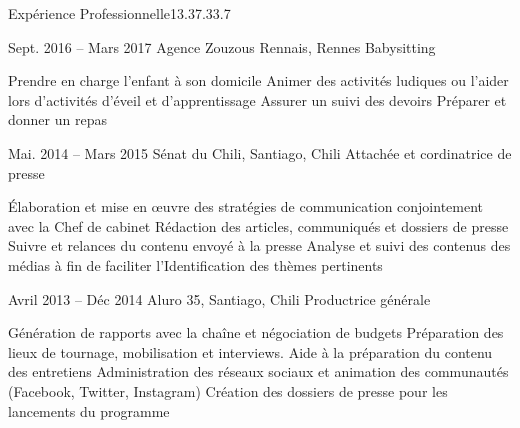 \documentclass[30pt, french]{tccv}
\begin{document}
\begin{upshape}
\begin{flat_frame}{Expérience Professionnelle}{13.3}{7.3}{3.7}{}
\begin{eventlist}
\setlength{\parskip}{0pt}    
\item{Sept. 2016 -- Mars 2017 }     
  {Agence Zouzous Rennais, Rennes}     
  {Babysitting}
     \fontsize{9pt}{1em}\color{text}\bodyfontlight\upshape\selectfont

\begin{itemize}
      \cvitem[\checkmark]  Prendre en charge l’enfant à son domicile                                    
      \cvitem[\checkmark]  Animer des activités ludiques ou l’aider lors d’activités d’éveil et d’apprentissage                                            
      \cvitem[\checkmark]  Assurer un suivi des devoirs
      \cvitem[\checkmark]  Préparer et donner un repas

\end{itemize}       





  
\setlength{\parskip}{0pt}
\item{Mai. 2014 -- Mars 2015 }     
  {Sénat du Chili, Santiago, Chili}     
  {Attachée et cordinatrice de presse}
  \fontsize{9pt}{1em}\color{text}\bodyfontlight\upshape\selectfont

  
\begin{itemize}
      \cvitem[\checkmark] Élaboration et mise en œuvre des stratégies de communication conjointement avec la Chef de cabinet
      \cvitem[\checkmark] Rédaction des articles, communiqués et dossiers de presse
      \cvitem[\checkmark] Suivre et relances du contenu envoyé à la presse
      \cvitem[\checkmark] Analyse et suivi des contenus des médias à fin de faciliter l'Identification des thèmes pertinents
\end{itemize}        




\setlength{\parskip}{0pt}
\item{Avril 2013 -- Déc 2014 }     
  {Aluro 35, Santiago, Chili}     
  {Productrice générale}
\fontsize{9pt}{1em}\color{text}\bodyfontlight\upshape\selectfont

    
\begin{itemize}
      \cvitem[\checkmark] Génération de rapports avec la chaîne et négociation de budgets                   
      \cvitem[\checkmark] Préparation des lieux de tournage, mobilisation et interviews. Aide à la préparation du contenu des entretiens   
      \cvitem[\checkmark] Administration des réseaux sociaux et animation des communautés (Facebook, Twitter, Instagram)                                                                    
      \cvitem[\checkmark] Création des dossiers de presse pour les lancements du programme      
\end{itemize}      
  



\end{eventlist}
\end{flat_frame}
\end{upshape}
\end{document}
